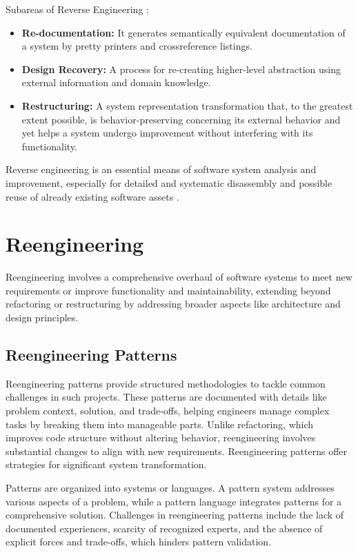 Subareas of Reverse Engineering \cite{ReverseEngineering2011}: 
\begin{itemize}
  \item \textbf{Re-documentation:} It generates semantically equivalent documentation of a system by pretty printers and crossreference listings.
  
  \item \textbf{Design Recovery:} A process for re-creating higher-level abstraction using external information and domain knowledge.
  
  \item \textbf{Restructuring:} A system representation transformation that, to the greatest extent possible, is behavior-preserving concerning its external behavior and yet helps a system undergo improvement without interfering with its functionality.
\end{itemize}

Reverse engineering is an essential means of software system analysis and improvement, especially for detailed and systematic disassembly and possible reuse of already existing software assets \cite{ReverseEngineering1990}.



\section{Reengineering}

Reengineering involves a comprehensive overhaul of software systems to meet new requirements or improve functionality and maintainability, extending beyond refactoring or restructuring by addressing broader aspects like architecture and design principles.

\subsection{Reengineering Patterns}

Reengineering patterns provide structured methodologies to tackle common challenges in such projects. These patterns are documented with details like problem context, solution, and trade-offs, helping engineers manage complex tasks by breaking them into manageable parts. Unlike refactoring, which improves code structure without altering behavior, reengineering involves substantial changes to align with new requirements. Reengineering patterns offer strategies for significant system transformation.

Patterns are organized into systems or languages. A pattern system addresses various aspects of a problem, while a pattern language integrates patterns for a comprehensive solution. Challenges in reengineering patterns include the lack of documented experiences, scarcity of recognized experts, and the absence of explicit forces and trade-offs, which hinders pattern validation.

